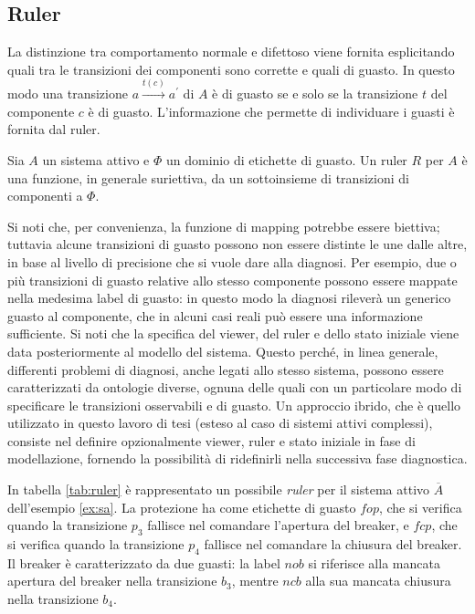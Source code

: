 \subsection{Ruler}
La distinzione tra comportamento normale e difettoso viene fornita esplicitando quali tra le transizioni dei componenti sono corrette e quali di guasto. In questo modo una transizione $a \xrightarrow{t(c)} a^\prime$ di $A$ è di guasto se e solo se la transizione $t$ del componente $c$ è di guasto.
L'informazione che permette di individuare i guasti è fornita dal ruler.
\begin{defn}
Sia $A$ un sistema attivo e $\Phi$ un dominio di etichette di guasto. Un ruler $R$ per $A$ è una funzione, in generale suriettiva, da un sottoinsieme di transizioni di componenti a $\Phi$.
\end{defn}
Si noti che, per convenienza, la funzione di mapping potrebbe essere biettiva; tuttavia alcune transizioni di guasto possono non essere distinte le une dalle altre, in base al livello di precisione che si vuole dare alla diagnosi. Per esempio, due o più transizioni di guasto relative allo stesso componente possono essere mappate nella medesima label di guasto: in questo modo la diagnosi rileverà un generico guasto al componente, che in alcuni casi reali può essere una informazione sufficiente.
Si noti che la specifica del viewer, del ruler e dello stato iniziale viene data posteriormente al modello del sistema. Questo perché, in linea generale, differenti problemi di diagnosi, anche legati allo stesso sistema, possono essere caratterizzati da ontologie diverse, ognuna delle quali con un particolare modo di specificare le transizioni osservabili e di guasto. Un approccio ibrido, che è quello utilizzato in questo lavoro di tesi (esteso al caso di sistemi attivi complessi), consiste nel definire opzionalmente viewer, ruler e stato iniziale in fase di modellazione, fornendo la possibilità di ridefinirli nella successiva fase  diagnostica.

\begin{ex}
In tabella \ref{tab:ruler} è rappresentato un possibile \emph{ruler} per il sistema attivo $\overline{A}$ dell'esempio \ref{ex:sa}. La protezione ha come etichette di guasto $fop$, che si verifica quando la transizione $p_3$ fallisce nel comandare l'apertura del breaker, e $fcp$, che si verifica quando la transizione $p_4$ fallisce nel comandare la chiusura del breaker. 
Il breaker è caratterizzato da due guasti: la label $nob$ si riferisce alla mancata apertura del breaker nella transizione $b_3$, mentre $ncb$ alla sua mancata chiusura nella transizione $b_4$.
\end{ex}

